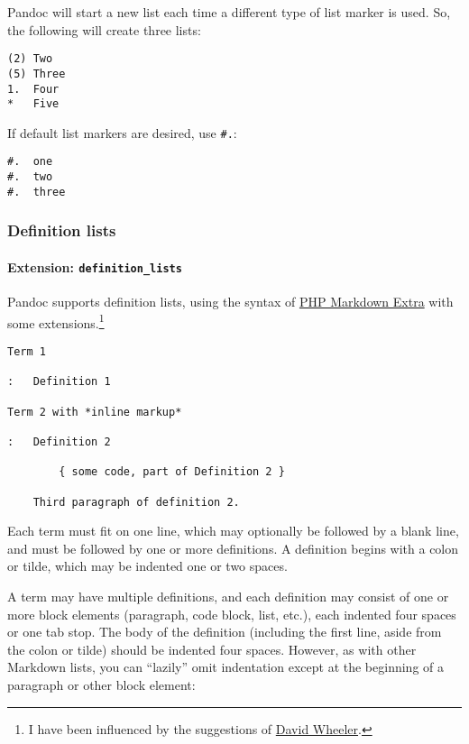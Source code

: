 \documentclass[]{article}
\let\oldparagraph\paragraph
\renewcommand{\paragraph}[1]{\oldparagraph{#1}\mbox{}}
\begin{document}
Pandoc will start a new list each time a different type of list marker
is used. So, the following will create three lists:

\begin{verbatim}
(2) Two
(5) Three
1.  Four
*   Five
\end{verbatim}

If default list markers are desired, use \texttt{\#.}:

\begin{verbatim}
#.  one
#.  two
#.  three
\end{verbatim}

\hypertarget{definition-lists}{\subsubsection{Definition
lists}\label{definition-lists}}

\paragraph{\texorpdfstring{Extension:
\texttt{definition\_lists}}{Extension: definition\_lists}}\label{extension-definition_lists}

Pandoc supports definition lists, using the syntax of
\href{https://michelf.ca/projects/php-markdown/extra/}{PHP Markdown
Extra} with some extensions.\footnote{I have been influenced by the
  suggestions of
  \href{http://www.justatheory.com/computers/markup/modest-markdown-proposal.html}{David
  Wheeler}.}

\begin{verbatim}
Term 1

:   Definition 1

Term 2 with *inline markup*

:   Definition 2

        { some code, part of Definition 2 }

    Third paragraph of definition 2.
\end{verbatim}

Each term must fit on one line, which may optionally be followed by a
blank line, and must be followed by one or more definitions. A
definition begins with a colon or tilde, which may be indented one or
two spaces.

A term may have multiple definitions, and each definition may consist of
one or more block elements (paragraph, code block, list, etc.), each
indented four spaces or one tab stop. The body of the definition
(including the first line, aside from the colon or tilde) should be
indented four spaces. However, as with other Markdown lists, you can
``lazily'' omit indentation except at the beginning of a paragraph or
other block element:
\end{document}
